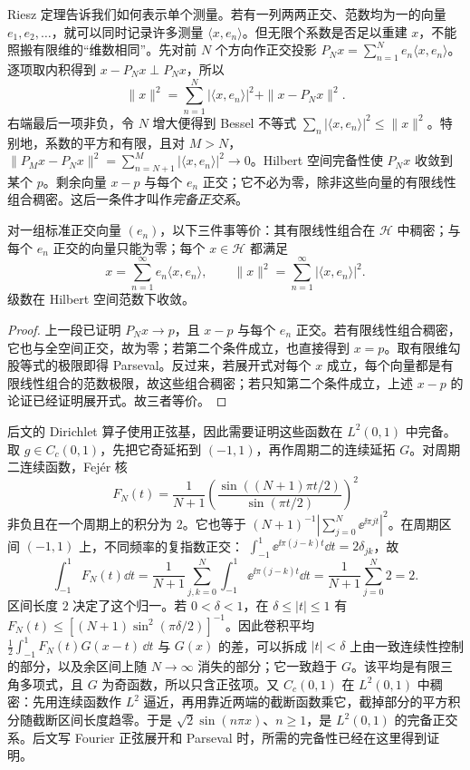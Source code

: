 Riesz 定理告诉我们如何表示单个测量。若有一列两两正交、范数均为一的向量 \(e_1,e_2,\ldots\)，就可以同时记录许多测量 \(\langle x,e_n\rangle\)。但无限个系数是否足以重建 \(x\)，不能照搬有限维的“维数相同”。先对前 \(N\) 个方向作正交投影 \(P_Nx=\sum_{n=1}^N e_n\langle x,e_n\rangle\)。逐项取内积得到 \(x-P_Nx\perp P_Nx\)，所以
\[
 \|x\|^2=\sum_{n=1}^N|\langle x,e_n\rangle|^2+\|x-P_Nx\|^2.
\]
右端最后一项非负，令 \(N\) 增大便得到 Bessel 不等式 \(\sum_n|\langle x,e_n\rangle|^2\le\|x\|^2\)。特别地，系数的平方和有限，且对 \(M>N\)，\(\|P_Mx-P_Nx\|^2=\sum_{n=N+1}^M|\langle x,e_n\rangle|^2\to0\)。Hilbert 空间完备性使 \(P_Nx\) 收敛到某个 \(p\)。剩余向量 \(x-p\) 与每个 \(e_n\) 正交；它不必为零，除非这些向量的有限线性组合稠密。这后一条件才叫作\emph{完备正交系}。

\begin{theorem}
 对一组标准正交向量 \((e_n)\)，以下三件事等价：其有限线性组合在 \(\mathcal H\) 中稠密；与每个 \(e_n\) 正交的向量只能为零；每个 \(x\in\mathcal H\) 都满足
 \begin{equation}
 x=\sum_{n=1}^\infty e_n\langle x,e_n\rangle,
 \qquad \|x\|^2=\sum_{n=1}^\infty|\langle x,e_n\rangle|^2.
 \label{eq:math-parseval}
 \end{equation}
 级数在 Hilbert 空间范数下收敛。
\end{theorem}
\begin{proof}
 上一段已证明 \(P_Nx\to p\)，且 \(x-p\) 与每个 \(e_n\) 正交。若有限线性组合稠密，它也与全空间正交，故为零；若第二个条件成立，也直接得到 \(x=p\)。取有限维勾股等式的极限即得 Parseval。反过来，若展开式对每个 \(x\) 成立，每个向量都是有限线性组合的范数极限，故这些组合稠密；若只知第二个条件成立，上述 \(x-p\) 的论证已经证明展开式。故三者等价。
\end{proof}

后文的 Dirichlet 算子使用正弦基，因此需要证明这些函数在 \(L^2(0,1)\) 中完备。取 \(g\in C_c(0,1)\)，先把它奇延拓到 \((-1,1)\)，再作周期二的连续延拓 \(G\)。对周期二连续函数，Fejér 核
\[
 F_N(t)=\frac1{N+1}\left(\frac{\sin((N+1)\pi t/2)}{\sin(\pi t/2)}\right)^2
\]
非负且在一个周期上的积分为 \(2\)。它也等于 \((N+1)^{-1}|\sum_{j=0}^N\ee^{\ii\pi jt}|^2\)。在周期区间 \((-1,1)\) 上，不同频率的复指数正交：
\(\int_{-1}^1\ee^{\ii\pi(j-k)t}\dd t=2\delta_{jk}\)，故
\[
\int_{-1}^1F_N(t)\dd t
=\frac1{N+1}\sum_{j,k=0}^N\int_{-1}^1\ee^{\ii\pi(j-k)t}\dd t
=\frac1{N+1}\sum_{j=0}^N2=2.
\]
区间长度 \(2\) 决定了这个归一。若 \(0<\delta<1\)，在 \(\delta\le|t|\le1\) 有 \(F_N(t)\le[(N+1)\sin^2(\pi\delta/2)]^{-1}\)。因此卷积平均 \(\frac12\int_{-1}^1F_N(t)G(x-t)\,\dd t\) 与 \(G(x)\) 的差，可以拆成 \(|t|<\delta\) 上由一致连续性控制的部分，以及余区间上随 \(N\to\infty\) 消失的部分；它一致趋于 \(G\)。该平均是有限三角多项式，且 \(G\) 为奇函数，所以只含正弦项。又 \(C_c(0,1)\) 在 \(L^2(0,1)\) 中稠密：先用连续函数作 \(L^2\) 逼近，再用靠近两端的截断函数乘它，截掉部分的平方积分随截断区间长度趋零。于是 \(\sqrt2\sin(n\pi x)\)、\(n\ge1\)，是 \(L^2(0,1)\) 的完备正交系。后文写 Fourier 正弦展开和 Parseval 时，所需的完备性已经在这里得到证明。


